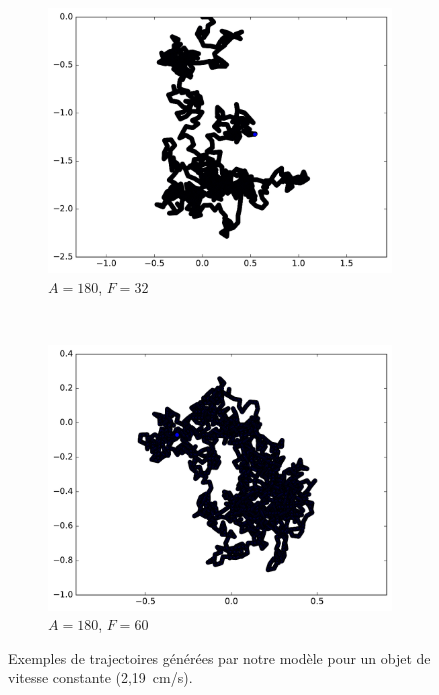 \begin{figure}[htb]
\begin{subfigure}[t]{\subImgWmo}
			\includegraphics[width=\textwidth]{figures/ch3/synTraj_219_180_32}
			\caption[$A = 180$, $F=32$]{$A = 180$, $F=32$}
			\label{fig:synTraj_219_180_32}
		\end{subfigure}
		~
		\begin{subfigure}[t]{\subImgWmo}
			\centering
			\includegraphics[width=\textwidth]{figures/ch3/synTraj_219_180_60}
			\caption[$A = 180$, $F=60$]{$A = 180$, $F=60$}
			\label{fig:synTraj_219_180_60}
		\end{subfigure}
		\caption[Mouvements générés par notre modèle -- VI]{Exemples de trajectoires générées par notre modèle pour un objet de vitesse constante (2,19~cm/s).}
		\label{fig:motion165180}
	\end{figure}
	

